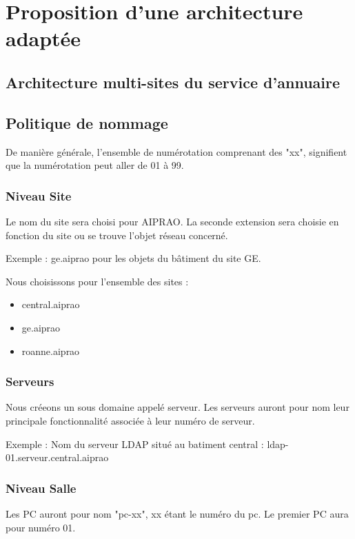 \section{Proposition d'une architecture adaptée}

\subsection{Architecture multi-sites du service d'annuaire}

\subsection{Politique de nommage}

De manière générale, l'ensemble de numérotation comprenant des "xx", signifient 
que la numérotation peut aller de 01 à 99.

\subsubsection{Niveau Site}

Le nom du site sera choisi pour AIPRAO. La seconde extension sera choisie en fonction
du site ou se trouve l'objet réseau concerné. 

Exemple : ge.aiprao pour les objets du bâtiment du site GE. 

Nous choisissons pour l'ensemble des sites : 
\begin{itemize}
\item central.aiprao
\item ge.aiprao
\item roanne.aiprao
\end{itemize}

\subsubsection{Serveurs}

Nous créeons un sous domaine appelé serveur. Les serveurs auront pour nom leur 
principale fonctionnalité associée à leur numéro de serveur. 

Exemple : Nom du serveur LDAP situé au batiment central : ldap-01.serveur.central.aiprao

\subsubsection{Niveau Salle}

Les PC auront pour nom "pc-xx", xx étant le numéro du pc. Le premier PC aura 
pour numéro 01.

